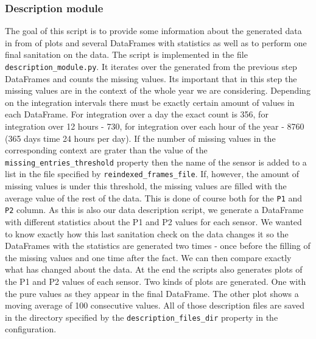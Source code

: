 \documentclass[12pt,a4paper,twoside]{scrartcl}
\numberwithin{equation}{section}
\begin{document}
\subsubsection{Description module}
\label{sec:desc-module}
The goal of this script is to provide some information about the generated data in from of plots and several DataFrames with statistics as well as to perform one final sanitation on the data. The script is implemented in the file \texttt{description\_module.py}. It iterates over the generated from the previous step DataFrames and counts the missing values. Its important that in this step the missing values are in the context of the whole year we are considering. Depending on the integration intervals there must be exactly certain amount of values in each DataFrame. For integration over a day the exact count is 356, for integration over 12 hours - 730, for integration over each hour of the year - 8760 (365 days time 24 hours per day). If the number of missing values in the corresponding context are grater than the value of the \texttt{missing\_entries\_threshold} property then the name of the sensor is added to a list in the file specified by \texttt{reindexed\_frames\_file}. If, however, the amount of missing values is under this threshold, the missing values are filled with the average value of the rest of the data. This is done of course both for the \texttt{P1} and \texttt{P2} column. As this is also our data description script, we generate a DataFrame with different statistics about the P1 and P2 values for each sensor. We wanted to know exactly how this last sanitation check on the data changes it so the DataFrames with the statistics are generated two times - once before the filling of the missing values and one time after the fact. We can then compare exactly what has changed about the data. At the end the scripts also generates plots of the P1 and P2 values of each sensor. Two kinds of plots are generated. One with the pure values as they appear in the final DataFrame. The other plot shows a moving average of 100 consecutive values. All of those description files are saved in the directory specified by the \texttt{description\_files\_dir} property in the configuration.
\end{document}
